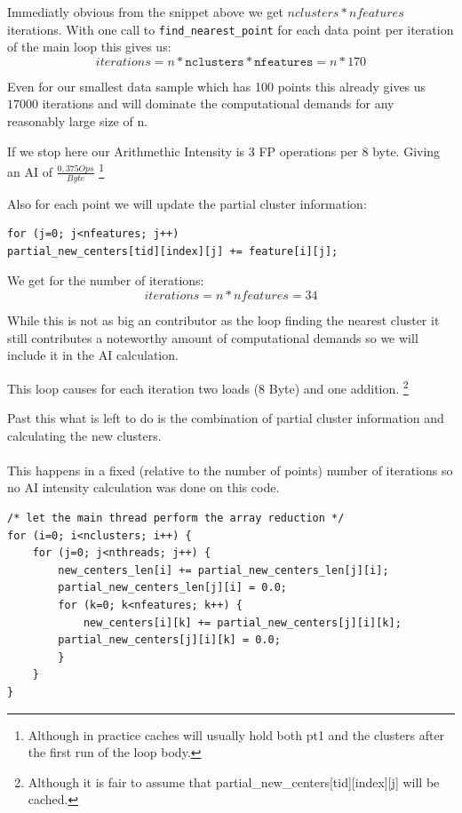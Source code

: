 Immediatly obvious from the snippet above we get $nclusters * nfeatures$ iterations.
With one call to \texttt{find\_nearest\_point} for each data point per iteration of the main loop this gives us:\\
$$iterations = n * \texttt{nclusters} * \texttt{nfeatures} = n * 170$$

Even for our smallest data sample which has 100 points this already gives us $17000$ iterations and will dominate the computational demands for any reasonably large size of n.

If we stop here our Arithmethic Intensity is 3 FP operations per 8 byte. Giving an AI of $\frac{0,375 Ops}{Byte}$
\footnote{Although in practice caches will usually hold both pt1 and the clusters after the first run of the loop body.}


Also for each point we will update the partial cluster information:
\begin{lstlisting}[caption={Updating (partial) cluster information},label=lblUpdPartClst]
for (j=0; j<nfeatures; j++)
partial_new_centers[tid][index][j] += feature[i][j];
\end{lstlisting}
We get for the number of iterations:
$$iterations = n * nfeatures = 34$$

While this is not as big an contributor as the loop finding the nearest cluster
it still contributes a noteworthy amount of computational demands so we will include it in the AI calculation.

This loop causes for each iteration two loads (8 Byte) and one addition.
\footnote{Although it is fair to assume that partial\_new\_centers[tid][index][j] will be cached.}

Past this what is left to do is the combination of partial cluster information and calculating the new clusters.

\paragraph{} This happens in a fixed (relative to the number of points) number of iterations so no AI intensity calculation was done on this code.


\begin{lstlisting}[caption={Reduction pt1}]
/* let the main thread perform the array reduction */
for (i=0; i<nclusters; i++) {
	for (j=0; j<nthreads; j++) {
		new_centers_len[i] += partial_new_centers_len[j][i];
		partial_new_centers_len[j][i] = 0.0;
		for (k=0; k<nfeatures; k++) {
			new_centers[i][k] += partial_new_centers[j][i][k];
		partial_new_centers[j][i][k] = 0.0;
		}
	}
}
\end{lstlisting}


